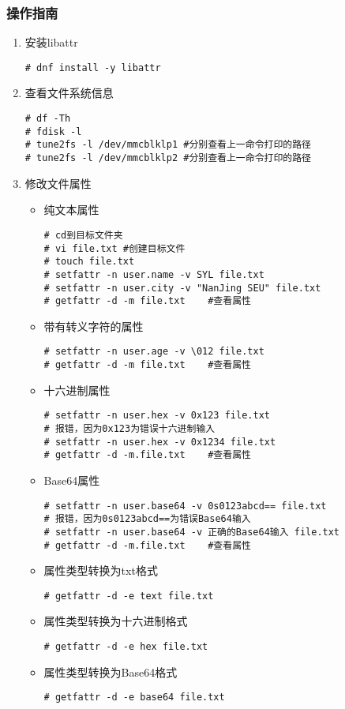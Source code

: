 \documentclass{article}
\begin{document}
\subsubsection{操作指南}
\begin{enumerate}
	\item 安装libattr
	      \begin{lstlisting}
# dnf install -y libattr
\end{lstlisting}

	\item 查看文件系统信息
	      \begin{lstlisting}
# df -Th
# fdisk -l
# tune2fs -l /dev/mmcblklp1 #分别查看上一命令打印的路径
# tune2fs -l /dev/mmcblklp2 #分别查看上一命令打印的路径
\end{lstlisting}
	\item 修改文件属性
	      \begin{itemize}
		      \item 纯文本属性
		            \begin{lstlisting}
# cd到目标文件夹
# vi file.txt #创建目标文件
# touch file.txt
# setfattr -n user.name -v SYL file.txt
# setfattr -n user.city -v "NanJing SEU" file.txt
# getfattr -d -m file.txt    #查看属性
\end{lstlisting}
		      \item 带有转义字符的属性
		            \begin{lstlisting}
# setfattr -n user.age -v \012 file.txt
# getfattr -d -m file.txt    #查看属性
\end{lstlisting}
		      \item 十六进制属性
		            \begin{lstlisting}
# setfattr -n user.hex -v 0x123 file.txt
# 报错，因为0x123为错误十六进制输入
# setfattr -n user.hex -v 0x1234 file.txt
# getfattr -d -m.file.txt    #查看属性
\end{lstlisting}
		      \item Base64属性
		            \begin{lstlisting}
# setfattr -n user.base64 -v 0s0123abcd== file.txt
# 报错，因为0s0123abcd==为错误Base64输入
# setfattr -n user.base64 -v 正确的Base64输入 file.txt
# getfattr -d -m.file.txt    #查看属性
\end{lstlisting}
		      \item 属性类型转换为txt格式
		            \begin{lstlisting}
# getfattr -d -e text file.txt
\end{lstlisting}
		      \item 属性类型转换为十六进制格式
		            \begin{lstlisting}
# getfattr -d -e hex file.txt
\end{lstlisting}
		      \item 属性类型转换为Base64格式
		            \begin{lstlisting}
# getfattr -d -e base64 file.txt
\end{lstlisting}
	      \end{itemize}
\end{enumerate}
\newpage
\end{document}

